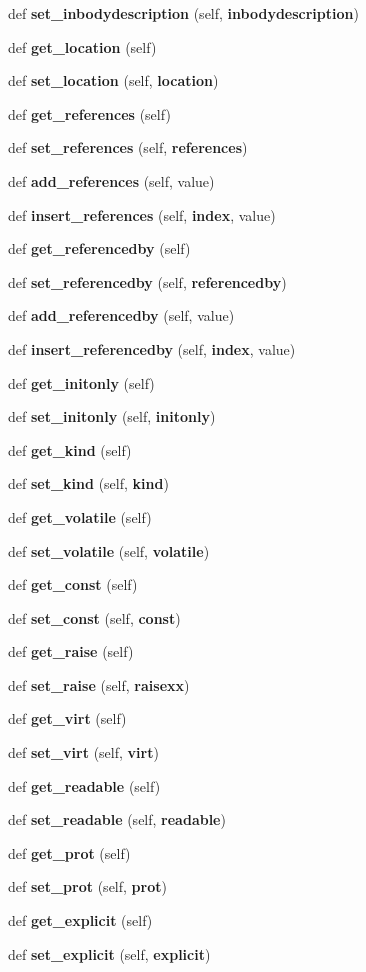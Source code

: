 \begin{DoxyCompactItemize}
def {\bf set\+\_\+inbodydescription} (self, {\bf inbodydescription})
\item 
def {\bf get\+\_\+location} (self)
\item 
def {\bf set\+\_\+location} (self, {\bf location})
\item 
def {\bf get\+\_\+references} (self)
\item 
def {\bf set\+\_\+references} (self, {\bf references})
\item 
def {\bf add\+\_\+references} (self, value)
\item 
def {\bf insert\+\_\+references} (self, {\bf index}, value)
\item 
def {\bf get\+\_\+referencedby} (self)
\item 
def {\bf set\+\_\+referencedby} (self, {\bf referencedby})
\item 
def {\bf add\+\_\+referencedby} (self, value)
\item 
def {\bf insert\+\_\+referencedby} (self, {\bf index}, value)
\item 
def {\bf get\+\_\+initonly} (self)
\item 
def {\bf set\+\_\+initonly} (self, {\bf initonly})
\item 
def {\bf get\+\_\+kind} (self)
\item 
def {\bf set\+\_\+kind} (self, {\bf kind})
\item 
def {\bf get\+\_\+volatile} (self)
\item 
def {\bf set\+\_\+volatile} (self, {\bf volatile})
\item 
def {\bf get\+\_\+const} (self)
\item 
def {\bf set\+\_\+const} (self, {\bf const})
\item 
def {\bf get\+\_\+raise} (self)
\item 
def {\bf set\+\_\+raise} (self, {\bf raisexx})
\item 
def {\bf get\+\_\+virt} (self)
\item 
def {\bf set\+\_\+virt} (self, {\bf virt})
\item 
def {\bf get\+\_\+readable} (self)
\item 
def {\bf set\+\_\+readable} (self, {\bf readable})
\item 
def {\bf get\+\_\+prot} (self)
\item 
def {\bf set\+\_\+prot} (self, {\bf prot})
\item 
def {\bf get\+\_\+explicit} (self)
\item 
def {\bf set\+\_\+explicit} (self, {\bf explicit})
\item 

\end{DoxyCompactItemize}
